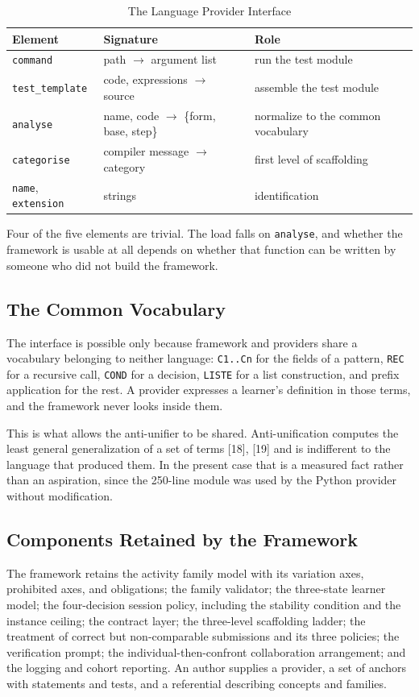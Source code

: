 \documentclass[10pt,twocolumn,letterpaper]{article}
\begin{document}
\begin{table}[h]
\centering\footnotesize
\caption{The Language Provider Interface}
\begin{tabular}{@{}p{1.05in}p{2.25in}p{2.4in}@{}}
\toprule
Element & Signature & Role \\
\midrule
\texttt{command} & path $\rightarrow$ argument list & run the test module \\
\texttt{test\_template} & code, expressions $\rightarrow$ source & assemble the test module \\
\texttt{analyse} & name, code $\rightarrow$ \{form, base, step\} & normalize to the common vocabulary \\
\texttt{categorise} & compiler message $\rightarrow$ category & first level of scaffolding \\
\texttt{name}, \texttt{extension} & strings & identification \\
\bottomrule
\end{tabular}
\end{table}

Four of the five elements are trivial. The load falls on
\texttt{analyse}, and whether the framework is usable at all depends on
whether that function can be written by someone who did not build the
framework.

\subsection{The Common Vocabulary}
The interface is possible only because framework and providers share a
vocabulary belonging to neither language: \texttt{C1..Cn} for the fields
of a pattern, \texttt{REC} for a recursive call, \texttt{COND} for a
decision, \texttt{LISTE} for a list construction, and prefix application
for the rest. A provider expresses a learner's definition in those
terms, and the framework never looks inside them.

This is what allows the anti-unifier to be shared. Anti-unification
computes the least general generalization of a set of terms [18],
[19] and is indifferent to the language that produced them. In the
present case that is a measured fact rather than an aspiration, since
the 250-line module was used by the Python provider without
modification.

\subsection{Components Retained by the Framework}
The framework retains the activity family model with its variation axes,
prohibited axes, and obligations; the family validator; the three-state
learner model; the four-decision session policy, including the stability
condition and the instance ceiling; the contract layer; the three-level
scaffolding ladder; the treatment of correct but non-comparable
submissions and its three policies; the verification prompt; the
individual-then-confront collaboration arrangement; and the logging and
cohort reporting. An author supplies a provider, a set of anchors with
statements and tests, and a referential describing concepts and
families.
\end{document}
